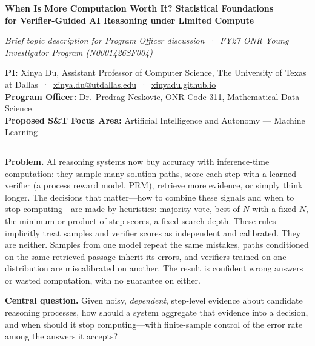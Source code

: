 \documentclass[11pt]{article}
\newcommand{\head}[1]{{\color{navy}\textbf{#1}}\enspace}
\newcommand{\POline}{Dr.\ Predrag Neskovic, ONR Code 311, Mathematical Data Science}
\newcommand{\FocusArea}{Artificial Intelligence and Autonomy --- Machine Learning}
\begin{document}
\begin{center}
{\fontsize{15.5}{18.5}\selectfont\bfseries\color{navy} When Is More Computation Worth It? Statistical Foundations\\[1pt] for Verifier-Guided AI Reasoning under Limited Compute\par}
\vspace{3pt}
{\small\itshape Brief topic description for Program Officer discussion \,·\, FY27 ONR Young Investigator Program (N0001426SF004)\par}
\end{center}
\vspace{-2pt}
{\small
\textbf{PI:} Xinya Du, Assistant Professor of Computer Science, The University of Texas at Dallas \,·\, \href{mailto:xinya.du@utdallas.edu}{xinya.du@utdallas.edu} \,·\, \href{https://xinyadu.github.io}{xinyadu.github.io}\\
\textbf{Program Officer:} \POline\\
\textbf{Proposed S\&T Focus Area:} \FocusArea\par}
\vspace{-3pt}
{\color{navy}\rule{\linewidth}{0.6pt}}

\head{Problem.} AI reasoning systems now buy accuracy with inference-time computation: they sample many solution paths, score each step with a learned verifier (a process reward model, PRM), retrieve more evidence, or simply think longer. The decisions that matter---how to combine these signals and when to stop computing---are made by heuristics: majority vote, best-of-$N$ with a fixed $N$, the minimum or product of step scores, a fixed search depth. These rules implicitly treat samples and verifier scores as independent and calibrated. They are neither. Samples from one model repeat the same mistakes, paths conditioned on the same retrieved passage inherit its errors, and verifiers trained on one distribution are miscalibrated on another. The result is confident wrong answers or wasted computation, with no guarantee on either.

\head{Central question.} Given noisy, \emph{dependent}, step-level evidence about candidate reasoning processes, how should a system aggregate that evidence into a decision, and when should it stop computing---with finite-sample control of the error rate among the answers it accepts?
\end{document}
